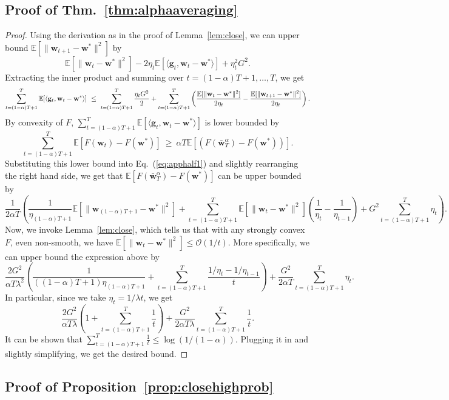 \documentclass{article}
\newcommand{\E}{\mathbb{E}}
\newcommand{\bw}{\mathbf{w}}
\newcommand{\bg}{\mathbf{g}}
\newcommand{\Ocal}{\mathcal{O}}
\newcommand{\norm}[1]{\|#1\|}
\newcommand{\inner}[1]{\langle#1\rangle}
\renewcommand{\eqref}[1]{Eq.~(\ref{#1})}
\newcommand{\lemref}[1]{Lemma~\ref{#1}}
\newcommand{\thmref}[1]{Thm.~\ref{#1}}
\newcommand{\propref}[1]{Proposition~\ref{#1}}
\begin{document}
\subsection{Proof of \thmref{thm:alphaaveraging}}\label{app:sufproof}
\begin{proof}
Using the derivation as in the proof of \lemref{lem:close}, we can upper bound $\E[\norm{\bw_{t+1}-\bw^{*}}^2]$ by
\[
\E[\norm{\bw_t-\bw^{*}}^2]-2\eta_t \E[\inner{\bg_t,\bw_t-\bw^{*}}]+\eta_t^2G^2.
\]
Extracting the inner product and summing over $t=(1-\alpha)T+1,\ldots,T$, we get
\begin{equation}
\sum_{t=(1-\alpha) T+1}^{T}\E[\inner{\bg_t,\bw_t-\bw^{*}}]
~\leq~ \sum_{t=(1-\alpha) T+1}^{T}\frac{\eta_t G^2}{2} +\notag
\sum_{t=(1-\alpha) T+1}^{T}\left(\frac{\E[\norm{\bw_t-\bw^{*}}^2]}{2\eta_t}-\frac{\E[\norm{\bw_{t+1}-\bw^{*}}^2]}{2\eta_t}\right).
\label{eq:apphalf1}
\end{equation}
By convexity of $F$, $\sum_{t=(1-\alpha) T+1}^{T}\E[\inner{\bg_t,\bw_t-\bw^{*}}]$ is lower bounded by
\[
\sum_{t=(1-\alpha) T+1}^{T}\E[F(\bw_t)-F(\bw^{*})]
~\geq~ \alpha T\E\left[\left(F(\bar{\bw}^{\alpha}_{T})-F(\bw^{*})\right)\right].
\]
Substituting this lower bound into \eqref{eq:apphalf1} and slightly rearranging the right hand side, we get that $\E[F(\bar{\bw}^{\alpha}_{T})-F(\bw^{*})]$ can be upper bounded by
\[
\frac{1}{2\alpha T}\left(\frac{1}{\eta_{(1-\alpha)T+1}}\E[\norm{\bw_{(1-\alpha)T+1}
-\bw^*}^2]
+
\sum_{t=(1-\alpha)T+1}^{T}\E[\norm{\bw_t-\bw^*}^2]
\left(\frac{1}{\eta_t}-\frac{1}{\eta_{t-1}}\right)
+
G^2\sum_{t=(1-\alpha)T+1}^{T}\eta_t\right).
\]
Now, we invoke \lemref{lem:close}, which tells us that with any strongly convex $F$, even non-smooth, we have $\E[\norm{\bw_t-\bw^{*}}^2]\leq \Ocal(1/t)$. More specifically, we can upper bound the expression above by
\[
\frac{2G^2}{\alpha T\lambda^2}\left(\frac{1}{((1-\alpha)T+1)\eta_{(1-\alpha)T+1}}
+
\sum_{t=(1-\alpha)T+1}^{T}\frac{1/\eta_t-1/\eta_{t-1}}{t}\right)
+
\frac{G^2}{2\alpha T}\sum_{t=(1-\alpha) T+1}^{T}\eta_t.
\]
In particular, since we take $\eta_t=1/\lambda t$, we get
\[
\frac{2G^2}{\alpha T \lambda}\left(1+\sum_{t=(1-\alpha)T+1}^{T}\frac{1}{t}\right)
+\frac{G^2}{2\alpha T \lambda}\sum_{t=(1-\alpha)T+1}^{T}\frac{1}{t}.
\]
It can be shown that $\sum_{t=(1-\alpha)T+1}^{T}\frac{1}{t} \leq \log(1/(1-\alpha))$. Plugging it in and slightly simplifying, we get the desired bound.
\end{proof}





\subsection{Proof of \propref{prop:closehighprob}}\label{app:highprob}
\end{document}
